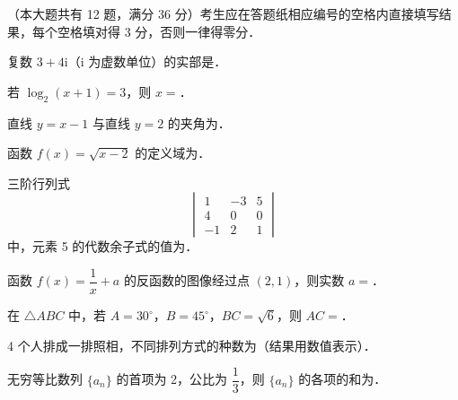 

（本大题共有 12 题，满分 36 分）考生应在答题纸相应编号的空格内直接填写结果，每个空格填对得 3 分，否则一律得零分．

\begin{question}
复数 \(3+4\mathrm{i}\)（\(\mathrm{i}\) 为虚数单位）的实部是\gkblank{}．

\end{question}
\begin{question}
若 \(\log_{2}(x+1)=3\)，则 \(x=\)\gkblank{}．

\end{question}
\begin{question}
直线 \(y=x-1\) 与直线 \(y=2\) 的夹角为\gkblank{}．

\end{question}
\begin{question}
函数 \(f(x)=\sqrt{x-2}\) 的定义域为\gkblank{}．

\end{question}
\begin{question}
三阶行列式
\nopagebreak[4]
\[
\begin{vmatrix}
1 & -3 & 5\\
4 & 0 & 0\\
-1 & 2 & 1
\end{vmatrix}
\]
中，元素 5 的代数余子式的值为\gkblank{}．

\end{question}
\begin{question}
函数 \(f(x)=\dfrac{1}{x}+a\) 的反函数的图像经过点 \((2,1)\)，则实数 \(a=\)\gkblank{}．

\end{question}
\begin{question}
在 \(\triangle ABC\) 中，若 \(A=30^{\circ}\)，\(B=45^{\circ}\)，\(BC=\sqrt{6}\)，则 \(AC=\)\gkblank{}．

\end{question}
\begin{question}
4 个人排成一排照相，不同排列方式的种数为\gkblank{}（结果用数值表示）．

\end{question}
\begin{question}
无穷等比数列 \(\{a_{n}\}\) 的首项为 2，公比为 \(\dfrac{1}{3}\)，则 \(\{a_{n}\}\) 的各项的和为\gkblank{}．

\end{question}
